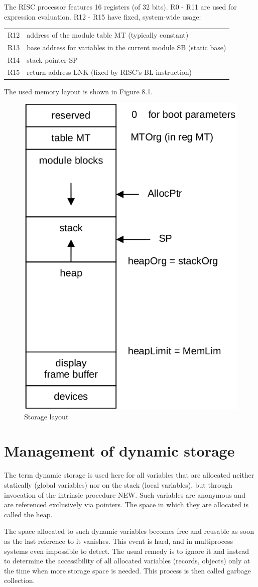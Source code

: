The RISC processor features 16 registers (of 32 bits). R0 - R11 are used for expression evaluation.
R12 - R15 have fixed, system-wide usage:
\begin{table}[h!]
	\centering
	\begin{tabular}{l l}
		R12 & address of the module table MT (typically constant) \\
		R13 & base address for variables in the current module SB (static base) \\
		R14 & stack pointer SP \\
		R15 & return address LNK (fixed by RISC's BL instruction)
	\end{tabular}
\end{table}

The used memory layout is shown in Figure 8.1.
\begin{figure}
	\label{fig:storage-layout}
	\centering
	\includegraphics[width=.5\textwidth]{i/q}
	\caption{Storage layout}
\end{figure}

\section{Management of dynamic storage}
The term dynamic storage is used here for all variables that are allocated neither statically (global
variables) nor on the stack (local variables), but through invocation of the intrinsic procedure NEW.
Such variables are anonymous and are referenced exclusively via pointers. The space in which
they are allocated is called the heap.

The space allocated to such dynamic variables becomes free and reusable as soon as the last
reference to it vanishes. This event is hard, and in multiprocess systems even impossible to detect.
The usual remedy is to ignore it and instead to determine the accessibility of all allocated variables
(records, objects) only at the time when more storage space is needed. This process is then called
garbage collection.

